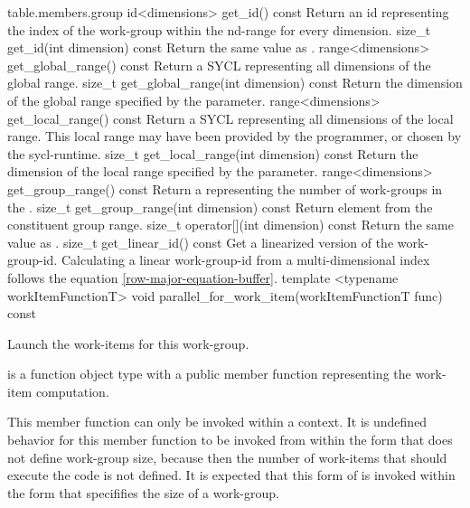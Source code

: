 {table.members.group}
  \addRow
    {id<dimensions> get_id() const}
    {
        Return an \gls{id} representing the index of the work-group
        within the \gls{nd-range} for every dimension.
    }
  \addRow
    {size_t get_id(int dimension) const}
    {
        Return the same value as .
    }
  \addRow
    {range<dimensions> get_global_range() const}
    {
        Return a SYCL  representing all dimensions of the global range.
    }
  \addRow
    {size_t get_global_range(int dimension) const}
    {
        Return the dimension of the global range specified by the  parameter.
    }
  \addRow
    {range<dimensions> get_local_range() const}
    {
        Return a SYCL  representing all dimensions of the local range.
        This local range may have been provided by the programmer, or chosen by the \gls{sycl-runtime}.
    }
  \addRow
    {size_t get_local_range(int dimension) const}
    {
        Return the dimension of the local range specified by the  parameter.
    }
  \addRow
    {range<dimensions> get_group_range() const}
    {
        Return a  representing the number of \glspl{work-group} in the .
    }
  \addRow
    {size_t get_group_range(int dimension) const}
    {
        Return element  from the constituent group range.
    }
  \addRow
    {size_t operator[](int dimension) const}
    {
        Return the same value as .
    }
  \addRow
    {size_t get_linear_id() const}
    {
        Get a linearized version of the \gls{work-group-id}.
        Calculating a linear \gls{work-group-id}
        from a multi-dimensional index follows the equation \ref{row-major-equation-buffer}.
    }
  \addRowTwoL
    {template <typename workItemFunctionT>}
    {void parallel_for_work_item(workItemFunctionT func) const}
    {
      Launch the work-items for this work-group.

       is a function object type with a public member function
      representing the work-item computation.

      This member function can only be invoked within a
       context.  It is
      undefined behavior for this member function to be invoked
      from within the  form that
      does not define work-group size, because then the number of
      work-items that should execute the code is not defined.  It is
      expected that this form of 
      is invoked within the  form
      that specififies the size of a work-group.
    }
